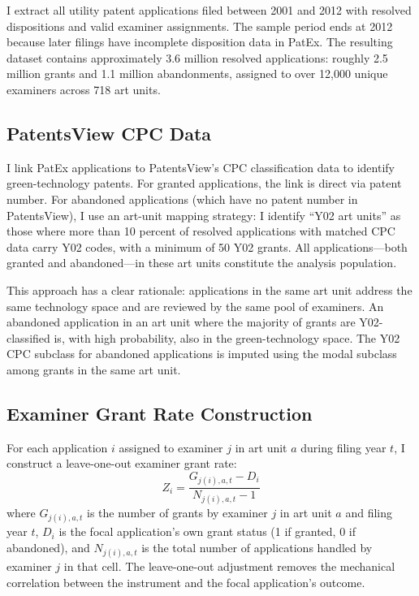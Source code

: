 \documentclass[12pt]{article}
\begin{document}
I extract all utility patent applications filed between 2001 and 2012 with resolved dispositions and valid examiner assignments. The sample period ends at 2012 because later filings have incomplete disposition data in PatEx. The resulting dataset contains approximately 3.6 million resolved applications: roughly 2.5 million grants and 1.1 million abandonments, assigned to over 12,000 unique examiners across 718 art units.

\subsection{PatentsView CPC Data}

I link PatEx applications to PatentsView's CPC classification data to identify green-technology patents. For granted applications, the link is direct via patent number. For abandoned applications (which have no patent number in PatentsView), I use an art-unit mapping strategy: I identify ``Y02 art units'' as those where more than 10 percent of resolved applications with matched CPC data carry Y02 codes, with a minimum of 50 Y02 grants. All applications---both granted and abandoned---in these art units constitute the analysis population.

This approach has a clear rationale: applications in the same art unit address the same technology space and are reviewed by the same pool of examiners. An abandoned application in an art unit where the majority of grants are Y02-classified is, with high probability, also in the green-technology space. The Y02 CPC subclass for abandoned applications is imputed using the modal subclass among grants in the same art unit.

\subsection{Examiner Grant Rate Construction}

For each application $i$ assigned to examiner $j$ in art unit $a$ during filing year $t$, I construct a leave-one-out examiner grant rate:
\begin{equation}
Z_{i} = \frac{G_{j(i),a,t} - D_i}{N_{j(i),a,t} - 1}
\label{eq:grantrate}
\end{equation}
where $G_{j(i),a,t}$ is the number of grants by examiner $j$ in art unit $a$ and filing year $t$, $D_i$ is the focal application's own grant status (1 if granted, 0 if abandoned), and $N_{j(i),a,t}$ is the total number of applications handled by examiner $j$ in that cell. The leave-one-out adjustment removes the mechanical correlation between the instrument and the focal application's outcome.
\end{document}
